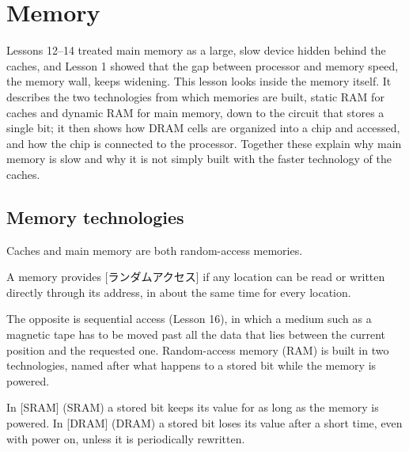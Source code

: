 \documentclass[../main.tex]{subfiles}
\begin{document}
\chapter{Memory}

Lessons 12--14 treated main memory as a large, slow device hidden behind the
caches, and Lesson 1 showed that the gap between processor and memory speed,
the memory wall, keeps widening.  This lesson looks inside the memory itself.
It describes the two technologies from which memories are built, static RAM
for caches and dynamic RAM for main memory, down to the circuit that stores a
single bit; it then shows how DRAM cells are organized into a chip and
accessed, and how the chip is connected to the processor.  Together these
explain why main memory is slow and why it is not simply built with the
faster technology of the caches.

\section{Memory technologies}
\label{sec:l15-technologies}

Caches and main memory are both random-access memories.

\begin{definition}
  A memory provides [ランダムアクセス] if any location can
  be read or written directly through its address, in about the same time for
  every location.
\end{definition}

The opposite is sequential access (Lesson 16), in which a medium such as a
magnetic tape has to be moved past all the data that lies between the current
position and the requested one.  Random-access memory (RAM) is built in two
technologies, named after what happens to a stored bit while the memory is
powered.

\begin{definition}
  In [SRAM]%
   (SRAM) a stored bit keeps its
  value for as long as the memory is powered.  In
  [DRAM]%
   (DRAM) a stored bit loses
  its value after a short time, even with power on, unless it is
  periodically rewritten.
\end{definition}
\end{document}
